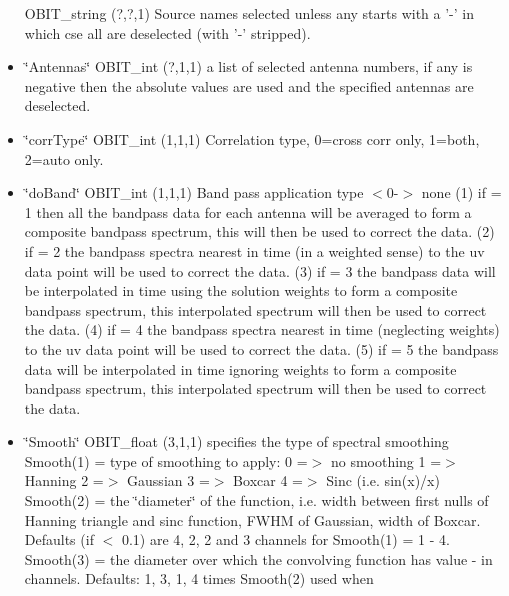 \begin{itemize}
OBIT\_\-string (?,?,1) Source names selected unless any starts with a '-' in which cse all are deselected (with '-' stripped). \item \char`\"{}Antennas\char`\"{} OBIT\_\-int (?,1,1) a list of selected antenna numbers, if any is negative then the absolute values are used and the specified antennas are deselected. \item \char`\"{}corr\-Type\char`\"{} OBIT\_\-int (1,1,1) Correlation type, 0=cross corr only, 1=both, 2=auto only. \item \char`\"{}do\-Band\char`\"{} OBIT\_\-int (1,1,1) Band pass application type $<$0-$>$ none (1) if = 1 then all the bandpass data for each antenna will be averaged to form a composite bandpass spectrum, this will then be used to correct the data. (2) if = 2 the bandpass spectra nearest in time (in a weighted sense) to the uv data point will be used to correct the data. (3) if = 3 the bandpass data will be interpolated in time using the solution weights to form a composite bandpass spectrum, this interpolated spectrum will then be used to correct the data. (4) if = 4 the bandpass spectra nearest in time (neglecting weights) to the uv data point will be used to correct the data. (5) if = 5 the bandpass data will be interpolated in time ignoring weights to form a composite bandpass spectrum, this interpolated spectrum will then be used to correct the data. \item \char`\"{}Smooth\char`\"{} OBIT\_\-float (3,1,1) specifies the type of spectral smoothing Smooth(1) = type of smoothing to apply: 0 =$>$ no smoothing 1 =$>$ Hanning 2 =$>$ Gaussian 3 =$>$ Boxcar 4 =$>$ Sinc (i.e. sin(x)/x) Smooth(2) = the \char`\"{}diameter\char`\"{} of the function, i.e. width between first nulls of Hanning triangle and sinc function, FWHM of Gaussian, width of Boxcar. Defaults (if $<$ 0.1) are 4, 2, 2 and 3 channels for Smooth(1) = 1 - 4. Smooth(3) = the diameter over which the convolving function has value - in channels. Defaults: 1, 3, 1, 4 times Smooth(2) used when\end{itemize}
